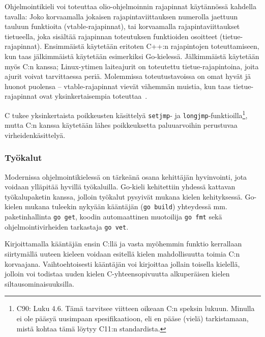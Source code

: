 Ohjelmointikieli voi toteuttaa olio-ohjelmoinnin rajapinnat käytännössä kahdella
tavalla: Joko korvaamalla jokaisen rajapintaviittauksen numerolla jaettuun
tauluun funktioita (vtable-rajapinnat), tai korvaamalla rajapintaviittaukset
tietueella, joka sisältää rajapinnan toteutuksen funktioiden osoitteet
(tietue-rajapinnat). Ensimmäistä käytetään eritoten C++:n rajapintojen
toteuttamiseen, kun taas jälkimmäistä käytetään esimerkiksi Go-kielessä.
Jälkimmäistä käytetään myös C:n kanssa; Linux-ytimen laiteajurit on toteutettu
tietue-rajapintoina, joita ajurit voivat tarvittaessa periä. Molemmissa
toteutustavoissa on omat hyvät jä huonot puolensa -- vtable-rajapinnat vievät
vähemmän muistia, kun taas tietue-rajapinnat ovat yksinkertaisempia
toteuttaa~\citationneeded.

C tukee yksinkertaista poikkeusten
käsittelyä \texttt{setjmp}- ja
\texttt{longjmp}-funktioilla\footnote{\label{cspecnote}C90: Luku 4.6. Tämä tarvitsee viitteen
oikeaan C:n speksin lukuun. Minulla ei ole pääsyä uusimpaan spesifikaatioon,
eli en pääse (vielä) tarkistamaan, mistä kohtaa tämä löytyy C11:n
standardista.}, mutta C:n kanssa käytetään lähes poikkeuksetta paluuarvoihin
perustuvaa virheidenkäsittelyä\citationneeded.

\subsubsection{Työkalut}

Modernissa ohjelmointikielessä on tärkeänä osana kehittäjän hyvinvointi, jota
voidaan ylläpitää hyvillä työkaluilla. Go-kieli kehitettiin yhdessä kattavan
työkalupaketin kanssa, jolloin työkalut pysyivät mukana kielen kehityksessä.
Go-kielen mukana tuleekin nykyään kääntäjän (\texttt{go build}) yhteydessä mm.
paketinhallinta \texttt{go get}, koodin automaattinen muotoilija \texttt{go
fmt} sekä ohjelmointivirheiden tarkastaja \texttt{go vet}.

Kirjoittamalla kääntäjän ensin C:llä ja vasta myöhemmin funktio kerrallaan
siirtymällä uuteen kieleen voidaan esitellä kielen mahdollisuutta toimia C:n
korvaajana. Vaihtoehtoisesti kääntäjän voi kirjoittaa jollain toisella
kielellä, jolloin voi todistaa uuden kielen C-yhteensopivuutta alkuperäisen
kielen siltausominaisuuksilla.



%
